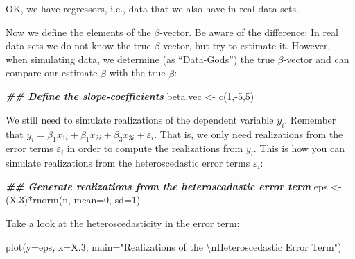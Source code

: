 \documentclass[
]{book}
\newenvironment{Shaded}{\begin{snugshade}}{\end{snugshade}}
\newcommand{\AttributeTok}[1]{\textcolor[rgb]{0.77,0.63,0.00}{#1}}
\newcommand{\DecValTok}[1]{\textcolor[rgb]{0.00,0.00,0.81}{#1}}
\newcommand{\DocumentationTok}[1]{\textcolor[rgb]{0.56,0.35,0.01}{\textbf{\textit{#1}}}}
\newcommand{\FloatTok}[1]{\textcolor[rgb]{0.00,0.00,0.81}{#1}}
\newcommand{\FunctionTok}[1]{\textcolor[rgb]{0.00,0.00,0.00}{#1}}
\newcommand{\NormalTok}[1]{#1}
\newcommand{\OtherTok}[1]{\textcolor[rgb]{0.56,0.35,0.01}{#1}}
\newcommand{\SpecialCharTok}[1]{\textcolor[rgb]{0.00,0.00,0.00}{#1}}
\newcommand{\StringTok}[1]{\textcolor[rgb]{0.31,0.60,0.02}{#1}}
\begin{document}
OK, we have regressors, i.e., data that we also have in real data sets.

Now we define the elements of the \(\beta\)-vector. Be aware of the difference: In real data sets we do not know the true \(\beta\)-vector, but try to estimate it. However, when simulating data, we determine (as ``Data-Gods'') the true \(\beta\)-vector and can compare our estimate \(\hat{\beta}\) with the true \(\beta\):

\begin{Shaded}
\begin{Highlighting}[]
\DocumentationTok{\#\# Define the slope{-}coefficients}
\NormalTok{beta.vec  }\OtherTok{\textless{}{-}} \FunctionTok{c}\NormalTok{(}\DecValTok{1}\NormalTok{,}\SpecialCharTok{{-}}\DecValTok{5}\NormalTok{,}\DecValTok{5}\NormalTok{)}
\end{Highlighting}
\end{Shaded}

\hfill\break
We still need to simulate realizations of the dependent variable \(y_i\). Remember that \(y_i=\beta_1 x_{1i}+\beta_1 x_{2i}+\beta_3 x_{3i}+\varepsilon_{i}\). That is, we only need realizations from the error terms \(\varepsilon_i\) in order to compute the realizations from \(y_i\). This is how you can simulate realizations from the heteroscedastic error terms \(\varepsilon_i\):

\begin{Shaded}
\begin{Highlighting}[]
\DocumentationTok{\#\# Generate realizations from the heteroscadastic error term}
\NormalTok{eps       }\OtherTok{\textless{}{-}}\NormalTok{ (X}\FloatTok{.3}\NormalTok{)}\SpecialCharTok{*}\FunctionTok{rnorm}\NormalTok{(n, }\AttributeTok{mean=}\DecValTok{0}\NormalTok{, }\AttributeTok{sd=}\DecValTok{1}\NormalTok{)}
\end{Highlighting}
\end{Shaded}

Take a look at the heteroscedasticity in the error term:

\begin{Shaded}
\begin{Highlighting}[]
\FunctionTok{plot}\NormalTok{(}\AttributeTok{y=}\NormalTok{eps, }\AttributeTok{x=}\NormalTok{X}\FloatTok{.3}\NormalTok{, }
     \AttributeTok{main=}\StringTok{"Realizations of the }\SpecialCharTok{\textbackslash{}n}\StringTok{Heteroscedastic Error Term"}\NormalTok{)}
\end{Highlighting}
\end{Shaded}
\end{document}
